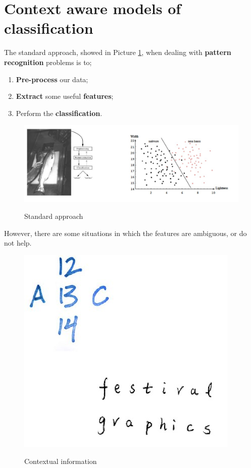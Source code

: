\section{Context aware models of classification}

The standard approach, showed in Picture \ref{camc1}, when dealing with \textbf{pattern recognition} problems is to;

\begin{enumerate}
    \item \textbf{Pre-process} our data;
    \item \textbf{Extract} some useful \textbf{features};
    \item Perform the \textbf{classification}.
\end{enumerate}

\begin{figure}[h!]
    \centering
    \includegraphics[scale = 1.4]{img/camc1.jpg}
    \label{camc1}
    \caption{Standard approach}
\end{figure}

However, there are some situations in which the features are ambiguous, or do not help.

\begin{figure}[h!]
    \centering
    \includegraphics[scale = 1.4]{img/camc2.jpg}
    \label{camc2}
    \caption{Contextual information}
\end{figure}

